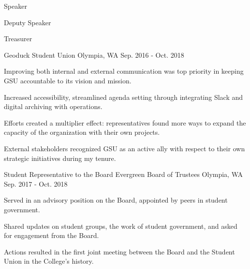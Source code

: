 

\begin{cventries}

  \cventry
    { %
    \begin{cvitems}
        \item {Speaker}
        \item {Deputy Speaker}
        \item {Treasurer}
      \end{cvitems}
      }
    {Geoduck Student Union} %
    {Olympia, WA} %
    {Sep. 2016 - Oct. 2018} %
    {
      \begin{cvitems} %
        \item {Improving both internal and external communication was top priority in keeping GSU accountable to its vision and mission.}     
        \item {Increased accessibility, streamlined agenda setting through integrating Slack and digital archiving with operations.}
         \item {Efforts created a multiplier effect: representatives found more ways to expand the capacity of the organization with their own projects.}
         \item {External stakeholders recognized GSU as an active ally with respect to their own strategic initiatives during my tenure.}
      \end{cvitems}
    }
  \cventry
    {Student Representative to the Board} %
    {Evergreen Board of Trustees} %
    {Olympia, WA} %
    {Sep. 2017 - Oct. 2018} %
    {
      \begin{cvitems} %
        \item {Served in an advisory position on the Board, appointed by peers in student government.}
        \item {Shared updates on student groups, the work of student government, and asked for engagement from the Board.}
        \item {Actions resulted in the first joint meeting between the Board and the Student Union in the College's history.}
      \end{cvitems}
    }


\end{cventries}
